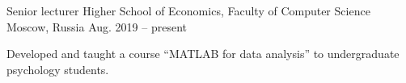 \begin{cventries}
  \cventry
    {Senior lecturer}
    {Higher School of Economics, Faculty of Computer Science}
    {Moscow, Russia}
    {Aug. 2019 -- present}
    {
      \begin{cvitems}
          \item Developed and taught a course ``MATLAB for data analysis'' to undergraduate psychology students.
      \end{cvitems}
    }
\end{cventries}
